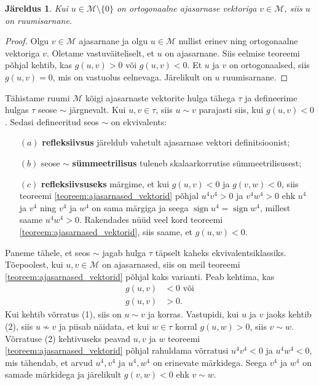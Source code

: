 \documentclass[12pt,a4paper,oneside]{article}
\theoremstyle{plain}
\newtheorem{jareldus}{Järeldus}[section]
\theoremstyle{definition}
\numberwithin{equation}{section}
\def\M{{\mathcal M}}
\DeclareMathOperator{\sign}{sign}
\begin{document}
\begin{jareldus}
Kui $u \in \M \setminus \{0\}$ on ortogonaalne ajasarnase vektoriga 
$v \in \M$, siis $u$ on ruumisarnane.
\end{jareldus}
\begin{proof}
Olgu $v \in \M$ ajasarnane ja olgu $u \in \M$ nullist erinev ning 
ortogonaalne vektoriga $v$. Oletame vastuväiteliselt, et $u$ on 
ajasarnane. Siis eelmise teoreemi põhjal kehtib, kas 
$g\left(u,v\right) > 0$ või $g\left(u,v\right) < 0$. Et $u$ ja $v$ 
on ortogonaalsed, siis $g\left(u,v\right) = 0$, mis on vastuolus 
eelnevaga. Järelikult on $u$ ruumisarnane.
\end{proof}

Tähistame ruumi $\M$ kõigi ajasarnaste vektorite hulga tähega $\tau$ 
ja defineerime hulgas $\tau$ seose $\sim$ järgnevalt. Kui 
$u,v \in \tau$, siis $u \sim v$ parajasti siis, kui 
$g\left(u,v\right) < 0$. Sedasi defineeritud seos $\sim$ on 
ekvivalents:
\begin{itemize}
\item[$(a)$] \textbf{refleksiivsus} järeldub vahetult ajasarnase 
	vektori definitsioonist;
\item[$(b)$] seose $\sim$ \textbf{sümmeetrilisus} tuleneb 
	skalaarkorrutise sümmeetrilisusest;
\item[$(c)$] \textbf{refleksiivsuseks} märgime, et kui 
	$g\left(u,v\right) < 0$ ja $g\left(v, w\right) < 0$, siis 
	teoreemi \ref{teoreem:ajasarnased_vektorid} põhjal 
	$u^4 v^4 > 0$ ja $v^4 w^4 > 0$ ehk $u^4$ ja $v^4$ ning $v^4$ ja 
	$w^4$ on sama märgiga ja seega $\sign u^4 = \sign w^4$, millest 
	saame $u^4 w^4 > 0$. Rakendades nüüd veel kord teoreemi 
	\ref{teoreem:ajasarnased_vektorid}, siis saame, et 
	$g\left(u, w\right) < 0$.
\end{itemize}
Paneme tähele, et seos $\sim$ jagab hulga $\tau$ täpselt kaheks 
ekvivalentsiklassiks. Tõe\-poolest, kui $u, v \in \M$ on ajasarnased, 
siis on meil teoreemi \ref{teoreem:ajasarnased_vektorid} põhjal kaks 
varianti. Peab kehtima, kas 
\begin{align}
g\left(u,v\right) &< 0 \text{ või} \tag{1} \\
g\left(u,v\right) &> 0. \tag{2}
\end{align}
Kui kehtib võrratus (1), siis on $u \sim v$ ja korras. Vastupidi, 
kui $u$ ja $v$ jaoks kehtib (2), siis $u \nsim v$ ja piisab näidata, 
et kui $w \in \tau$ korral $g\left(u,w\right) > 0$, siis $v \sim w$. 
Võrratuse (2) kehtivuseks peavad $u, v$ ja $w$ teoreemi 
\ref{teoreem:ajasarnased_vektorid} põhjal rahuldama võrratusi 
$u^4 v^4 < 0$ ja $u^4 w^4 < 0$, mis tähendab, et arvud $u^4, v^4$ ja 
$u^4, w^4$ on erinevate märkidega. Seega $v^4$ ja $w^4$ on samade 
märkidega ja järelikult $g\left(v,w\right) < 0$ ehk $v \sim w$.
\end{document}
